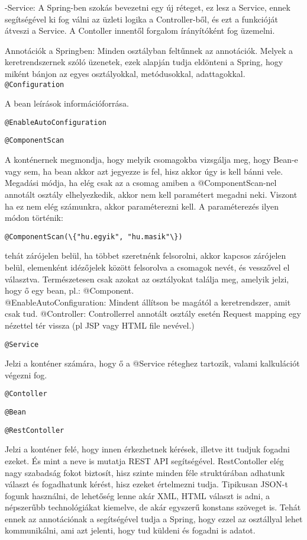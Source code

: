 \documentclass[11pt]{article}
\begin{document}
-Service: A Spring-ben szokás bevezetni egy új réteget, ez lesz a Service, ennek segítségével ki fog válni az üzleti logika a Controller-ből, és ezt a funkcióját átveszi a Service. A Contoller innentől forgalom írányítóként fog üzemelni.

Annotációk a Springben: Minden osztályban feltűnnek az annotációk. Melyek a keretrendszernek szóló üzenetek, ezek alapján tudja eldönteni a Spring, hogy miként bánjon az egyes osztályokkal, metódusokkal, adattagokkal.\\

\texttt{@Configuration}

A bean leírások információforrása.

\texttt{@EnableAutoConfiguration}

\texttt{@ComponentScan}

A konténernek megmondja, hogy melyik csomagokba vizsgálja meg, hogy Bean-e vagy sem, ha bean akkor azt jegyezze is fel, hisz akkor úgy is kell bánni vele. Megadási módja, ha elég csak az a csomag amiben a @ComponentScan-nel annotált osztály elhelyezkedik, akkor nem kell paramétert megadni neki. Viszont ha ez nem elég számunkra, akkor paraméterezni kell. A paraméterezés ilyen módon történik:
\begin{verbatim}
@ComponentScan(\{"hu.egyik", "hu.masik"\})
\end{verbatim}
tehát zárójelen belül, ha többet szeretnénk felsorolni, akkor kapcsos zárójelen belül, elemenként idézőjelek között felsorolva a csomagok nevét, és vesszővel el választva. Természetesen csak azokat az osztályokat találja meg, amelyik jelzi, hogy ő egy bean, pl.: @Component. \\

@EnableAutoConfiguration: Mindent állítson be magától a keretrendszer, amit csak tud.
@Controller: Controllerrel annotált osztály esetén Request mapping egy nézettel tér vissza (pl JSP vagy HTML file nevével.)


\texttt{@Service}

Jelzi a konténer számára, hogy ő a @Service réteghez tartozik, valami kalkulációt végezni fog.

\texttt{@Contoller}

\texttt{@Bean}

\texttt{@RestContoller}

Jelzi a konténer felé, hogy innen érkezhetnek kérések, illetve itt tudjuk fogadni ezeket. És mint a neve is mutatja REST API segítségével. RestContoller elég nagy szabadság fokot biztosít, hisz szinte minden féle struktúrában adhatunk választ és fogadhatunk kérést, hisz ezeket értelmezni tudja. Tipikusan JSON-t fogunk használni, de lehetőség lenne akár XML, HTML választ is adni, a népszerűbb technológiákat kiemelve, de akár egyszerű konstans szöveget is. Tehát ennek az annotációnak a segítségével tudja a Spring, hogy ezzel az osztállyal lehet kommunikálni, ami azt jelenti, hogy tud küldeni és fogadni is adatot.
\end{document}
